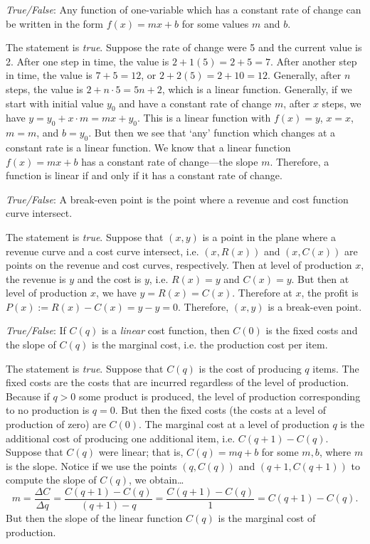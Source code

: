 \documentclass[11pt,letterpaper]{article}
\begin{document}
\thispagestyle{title}


\quizsol \textit{True/False}: Any function of one-variable which has a constant rate of change can be written in the form $f(x)= mx + b$ for some values $m$ and $b$. \pspace

\sol The statement is \textit{true}. Suppose the rate of change were 5 and the current value is 2. After one step in time, the value is $2 + 1(5)= 2 + 5= 7$. After another step in time, the value is $7 + 5= 12$, or $2 + 2(5)= 2 + 10= 12$. Generally, after $n$ steps, the value is $2 + n \cdot 5= 5n + 2$, which is a linear function. Generally, if we start with initial value $y_0$ and have a constant rate of change $m$, after $x$ steps, we have $y= y_0 + x \cdot m= mx + y_0$. This is a linear function with $f(x)= y$, $x= x$, $m= m$, and $b= y_0$. But then we see that `any' function which changes at a constant rate is a linear function. We know that a linear function $f(x)= mx + b$ has a constant rate of change---the slope $m$. Therefore, a function is linear if and only if it has a constant rate of change.  \pvspace{1.5cm}



\quizsol \textit{True/False}: A break-even point is the point where a revenue and cost function curve intersect. \pspace

\sol The statement is \textit{true}. Suppose that $(x, y)$ is a point in the plane where a revenue curve and a cost curve intersect, i.e. $(x, R(x) )$ and $(x, C(x) )$ are points on the revenue and cost curves, respectively. Then at level of production $x$, the revenue is $y$ and the cost is $y$, i.e. $R(x)= y$ and $C(x)= y$. But then at level of production $x$, we have $y= R(x)= C(x)$. Therefore at $x$, the profit is $P(x):= R(x) - C(x)= y - y= 0$. Therefore, $(x, y)$ is a break-even point. \pvspace{1.5cm}



\quizsol \textit{True/False}: If $C(q)$ is a \textit{linear} cost function, then $C(0)$ is the fixed costs and the slope of $C(q)$ is the marginal cost, i.e. the production cost per item. \pspace

\sol The statement is \textit{true}. Suppose that $C(q)$ is the cost of producing $q$ items. The fixed costs are the costs that are incurred regardless of the level of production. Because if $q > 0$ some product is produced, the level of production corresponding to no production is $q= 0$. But then the fixed costs (the costs at a level of production of zero) are $C(0)$. The marginal cost at a level of production $q$ is the additional cost of producing one additional item, i.e. $C(q + 1) - C(q)$. Suppose that $C(q)$ were linear; that is, $C(q)= mq + b$ for some $m, b$, where $m$ is the slope. Notice if we use the points $(q, C(q) )$ and $(q + 1, C(q + 1) )$ to compute the slope of $C(q)$, we obtain\dots
	\[
	m= \dfrac{\Delta C}{\Delta q}= \dfrac{C(q + 1) - C(q)}{(q + 1) - q}= \dfrac{C(q + 1) - C(q)}{1}= C(q + 1) - C(q).
	\]
But then the slope of the linear function $C(q)$ is the marginal cost of production. \pvspace{1.5cm}
\end{document}
